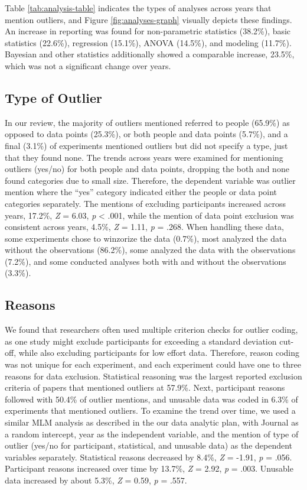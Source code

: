 \documentclass[english,man]{apa6}
\theoremstyle{definition}
\theoremstyle{definition}
\theoremstyle{definition}
\theoremstyle{remark}
\begin{document}
Table \ref{tab:analysis-table} indicates the types of analyses across
years that mention outliers, and Figure \ref{fig:analyses-graph}
visually depicts these findings. An increase in reporting was found for
non-parametric statistics (38.2\%), basic statistics (22.6\%),
regression (15.1\%), ANOVA (14.5\%), and modeling (11.7\%). Bayesian and
other statistics additionally showed a comparable increase, 23.5\%,
which was not a significant change over years.

\subsection{Type of Outlier}\label{type-of-outlier}

In our review, the majority of outliers mentioned referred to people
(65.9\%) as opposed to data points (25.3\%), or both people and data
points (5.7\%), and a final (3.1\%) of experiments mentioned outliers
but did not specify a type, just that they found none. The trends across
years were examined for mentioning outliers (yes/no) for both people and
data points, dropping the both and none found categories due to small
size. Therefore, the dependent variable was outlier mention where the
\enquote{yes} category indicated either the people or data point
categories separately. The mentions of excluding participants increased
across years, 17.2\%, \emph{Z} = 6.03, \emph{p} \textless{} .001, while
the mention of data point exclusion was consistent across years, 4.5\%,
\emph{Z} = 1.11, \emph{p} = .268. When handling these data, some
experiments chose to winzorize the data (0.7\%), most analyzed the data
without the observations (86.2\%), some analyzed the data with the
observations (7.2\%), and some conducted analyses both with and without
the observations (3.3\%).

\subsection{Reasons}\label{reasons}

We found that researchers often used multiple criterion checks for
outlier coding, as one study might exclude participants for exceeding a
standard deviation cut-off, while also excluding participants for low
effort data. Therefore, reason coding was not unique for each
experiment, and each experiment could have one to three reasons for data
exclusion. Statistical reasoning was the largest reported exclusion
criteria of papers that mentioned outliers at 57.9\%. Next, participant
reasons followed with 50.4\% of outlier mentions, and unusable data was
coded in 6.3\% of experiments that mentioned outliers. To examine the
trend over time, we used a similar MLM analysis as described in the our
data analytic plan, with Journal as a random intercept, year as the
independent variable, and the mention of type of outlier (yes/no for
participant, statistical, and unusable data) as the dependent variables
separately. Statistical reasons decreased by 8.4\%, \emph{Z} = -1.91,
\emph{p} = .056. Participant reasons increased over time by 13.7\%,
\emph{Z} = 2.92, \emph{p} = .003. Unusable data increased by about
5.3\%, \emph{Z} = 0.59, \emph{p} = .557.
\end{document}
